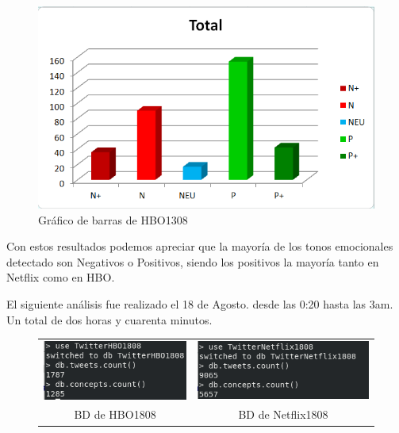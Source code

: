 \begin{figure}[H]
	\centering
	\includegraphics[scale=1]{imagenes/barrasHBO1308.PNG}
	\caption{Gráfico de barras de HBO1308}
	\label{fig:barrasHBO1308}
\end{figure}

Con estos resultados podemos apreciar que la mayoría de los tonos emocionales detectado son Negativos o Positivos, siendo los positivos la mayoría tanto en Netflix como en HBO. 


El siguiente análisis fue realizado el 18 de Agosto. desde las 0:20 hasta las 3am. Un total de dos horas y cuarenta minutos. 

\begin{figure}[H]
	\centering
	\begin{tabular}{c c}
		
		\includegraphics[scale=.7]{imagenes/HBO1808Mongo.png}
		&  \includegraphics[scale=.7]{imagenes/Netflix1808Mongo.png} \\ 
		
		{BD de HBO1808}
		
		&  {BD de Netflix1808} \\ 
		
	\end{tabular} 
	\label{fig:Mongo1808}
\end{figure}

